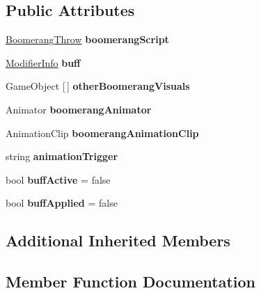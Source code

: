 \subsection*{Public Attributes}
\begin{DoxyCompactItemize}
\item 
\hypertarget{class_multi_boomerang_buff_ab7f489528f239fb815184ce54d1738ab}{}\label{class_multi_boomerang_buff_ab7f489528f239fb815184ce54d1738ab} 
\hyperlink{class_boomerang_throw}{Boomerang\+Throw} {\bfseries boomerang\+Script}
\item 
\hypertarget{class_multi_boomerang_buff_a0a0022ba4cfd58ab7818e367abd3e92c}{}\label{class_multi_boomerang_buff_a0a0022ba4cfd58ab7818e367abd3e92c} 
\hyperlink{struct_modifier_info}{Modifier\+Info} {\bfseries buff}
\item 
\hypertarget{class_multi_boomerang_buff_a3308518614680660ac579402313b2d9d}{}\label{class_multi_boomerang_buff_a3308518614680660ac579402313b2d9d} 
Game\+Object \mbox{[}$\,$\mbox{]} {\bfseries other\+Boomerang\+Visuals}
\item 
\hypertarget{class_multi_boomerang_buff_a29b1547db955af4ff8ceeb6b4f267217}{}\label{class_multi_boomerang_buff_a29b1547db955af4ff8ceeb6b4f267217} 
Animator {\bfseries boomerang\+Animator}
\item 
\hypertarget{class_multi_boomerang_buff_a63c750c7211b7f31fbbb08ecf8d0269b}{}\label{class_multi_boomerang_buff_a63c750c7211b7f31fbbb08ecf8d0269b} 
Animation\+Clip {\bfseries boomerang\+Animation\+Clip}
\item 
\hypertarget{class_multi_boomerang_buff_a7e4a0b5c647612903e622642f8528068}{}\label{class_multi_boomerang_buff_a7e4a0b5c647612903e622642f8528068} 
string {\bfseries animation\+Trigger}
\item 
\hypertarget{class_multi_boomerang_buff_a99dbbe980d35fa39d800896c0e94fe26}{}\label{class_multi_boomerang_buff_a99dbbe980d35fa39d800896c0e94fe26} 
bool {\bfseries buff\+Active} = false
\item 
\hypertarget{class_multi_boomerang_buff_a4c6c5f036c0c9385ba36380fb1c804f7}{}\label{class_multi_boomerang_buff_a4c6c5f036c0c9385ba36380fb1c804f7} 
bool {\bfseries buff\+Applied} = false
\end{DoxyCompactItemize}
\subsection*{Additional Inherited Members}


\subsection{Member Function Documentation}
\hypertarget{class_multi_boomerang_buff_ae7f8d7ceb8511f4a0c4af037f7f126ef}{}\label{class_multi_boomerang_buff_ae7f8d7ceb8511f4a0c4af037f7f126ef} 
